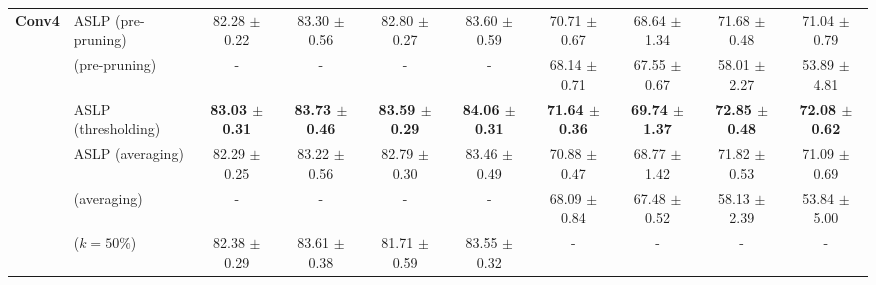 \begin{table}
{\begin{tabular}{llcccccccc}
       \multirow{6}{*}{\textbf{Conv4}} & ASLP (pre-pruning) & 82.28 $\pm$ 0.22 & 83.30 $\pm$ 0.56 & 82.80 $\pm$ 0.27 & 83.60 $\pm$ 0.59 & 70.71 $\pm$ 0.67 & 68.64 $\pm$ 1.34 & 71.68 $\pm$ 0.48 & 71.04 $\pm$ 0.79 \\
        & \cite{DBLP:conf/nips/ZhouLLY19} (pre-pruning) & - & - & - & - & 68.14 $\pm$ 0.71 & 67.55 $\pm$ 0.67 & 58.01 $\pm$ 2.27 & 53.89 $\pm$ 4.81 \\
      \cmidrule(lr){2-10}
        & ASLP (thresholding) & \textbf{83.03 $\pm$ 0.31} & \textbf{83.73 $\pm$ 0.46} & \textbf{83.59 $\pm$ 0.29} & \textbf{84.06 $\pm$ 0.31} & \textbf{71.64 $\pm$ 0.36} & \textbf{69.74 $\pm$ 1.37} & \textbf{72.85 $\pm$ 0.48} & \textbf{72.08 $\pm$ 0.62} \\
        & ASLP (averaging)& 82.29 $\pm$ 0.25 & 83.22 $\pm$ 0.56 & 82.79 $\pm$ 0.30 & 83.46 $\pm$ 0.49 & 70.88 $\pm$ 0.47 & 68.77 $\pm$ 1.42 & 71.82 $\pm$ 0.53 & 71.09 $\pm$ 0.69 \\
        & \cite{DBLP:conf/nips/ZhouLLY19} (averaging)& - & - & - & - & 68.09 $\pm$ 0.84 & 67.48 $\pm$ 0.52 & 58.13 $\pm$ 2.39 & 53.84 $\pm$ 5.00 \\
        & \cite{DBLP:conf/cvpr/RamanujanWKFR20} ($k=50\%$) & 82.38 $\pm$ 0.29 & 83.61 $\pm$ 0.38 & 81.71 $\pm$ 0.59 & 83.55 $\pm$ 0.32 & - & - & - & - \\
      \midrule


\end{tabular}}
\end{table}

